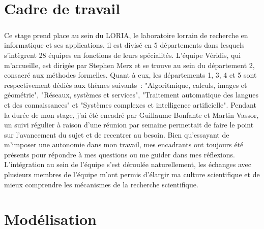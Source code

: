 \documentclass[oneside, a4paper, 11pt]{book}
\begin{document}
\chapter{Cadre de travail}
\paragraph{} 
Ce stage prend place au sein du LORIA, le laboratoire lorrain de recherche en informatique et ses applications, il est divisé en 5 départements dans lesquels s'intègrent 28 équipes en fonctions de leurs spécialités.
L'équipe Véridis, qui m'accueille, est dirigée par Stephen Merz et se trouve au sein du département 2, consacré aux méthodes formelles. Quant à eux, les départements 1, 3, 4 et 5 sont respectivement dédiés aux thèmes suivants~: "Algoritmique, calculs, images et géométrie", "Réseaux, systèmes et services", "Traitement automatique des langues et des connaissances" et "Systèmes complexes et intelligence artificielle".
Pendant la durée de mon stage, j'ai été encadré par Guillaume Bonfante et Martin Vassor, un suivi régulier à raison d'une réunion par semaine permettait de faire le point sur l'avancement du sujet et de recentrer au besoin.
Bien qu'essayant de m'imposer une autonomie dans mon travail, mes encadrants ont toujours été présents pour répondre à mes questions ou me guider dans mes réflexions.
L'intégration au sein de l'équipe s'est déroulée naturellement, les échanges avec plusieurs membres de l'équipe m'ont permis d'élargir ma culture scientifique et de mieux comprendre les mécanismes de la recherche scientifique.



\chapter{Modélisation}
\label{sec:modele}

\end{document}
